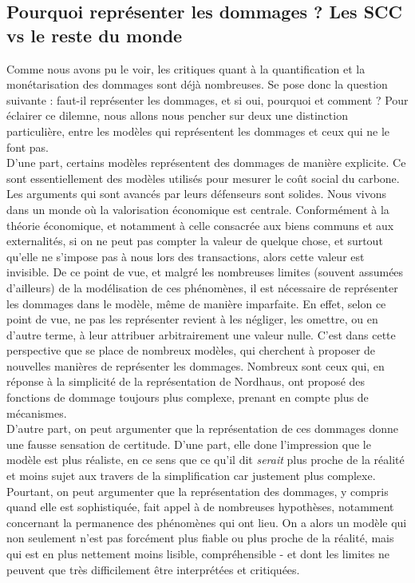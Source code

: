 \subsection{Pourquoi représenter les dommages ? Les SCC vs le reste du monde}

Comme nous avons pu le voir, les critiques quant à la quantification et la monétarisation des dommages sont déjà nombreuses. Se pose donc la question suivante : faut-il représenter les dommages, et si oui, pourquoi et comment ? Pour éclairer ce dilemne, nous allons nous pencher sur deux une distinction particulière, entre les modèles qui représentent les dommages et ceux qui ne le font pas. \\

D'une part, certains modèles représentent des dommages de manière explicite. Ce sont essentiellement des modèles utilisés pour mesurer le coût social du carbone. Les arguments qui sont avancés par leurs défenseurs sont solides. Nous vivons dans un monde où la valorisation économique est centrale. Conformément à la théorie économique, et notamment à celle consacrée aux biens communs et aux externalités, si on ne peut pas compter la valeur de quelque chose, et surtout qu'elle ne s'impose pas à nous lors des transactions, alors cette valeur est invisible. De ce point de vue, et malgré les nombreuses limites (souvent assumées d'ailleurs) de la modélisation de ces phénomènes, il est nécessaire de représenter les dommages dans le modèle, même de manière imparfaite. En effet, selon ce point de vue, ne pas les représenter revient à les négliger, les omettre, ou en d'autre terme, à leur attribuer arbitrairement une valeur nulle. 
C'est dans cette perspective que se place de nombreux modèles, qui cherchent à proposer de nouvelles manières de représenter les dommages. Nombreux sont ceux qui, en réponse à la simplicité de la représentation de Nordhaus, ont proposé des fonctions de dommage toujours plus complexe, prenant en compte plus de mécanismes. 
\\

D'autre part, on peut argumenter que la représentation de ces dommages donne une fausse sensation de certitude. D'une part, elle done l'impression que le modèle est plus réaliste, en ce sens que ce qu'il dit \textit{serait} plus proche de la réalité et moins sujet aux travers de la simplification car justement plus complexe. Pourtant, on peut argumenter que la représentation des dommages, y compris quand elle est sophistiquée, fait appel à de nombreuses hypothèses, notamment concernant la permanence des phénomènes qui ont lieu. On a alors un modèle qui non seulement n'est pas forcément plus fiable ou plus proche de la réalité, mais qui est en plus nettement moins lisible, compréhensible - et dont les limites ne peuvent que très difficilement être interprétées et critiquées. 

